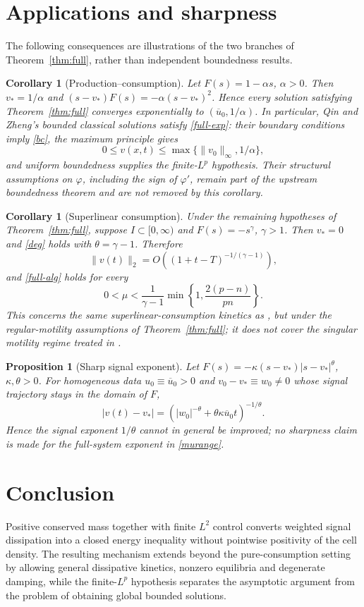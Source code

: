 \documentclass[final,5p,times,twocolumn]{elsarticle}
\newtheorem{corollary}[theorem]{Corollary}
\newtheorem{proposition}[theorem]{Proposition}
\newcommand{\norm}[1]{\lVert#1\rVert}
\newcommand{\ubar}{\overline u_0}
\begin{document}
\section{Applications and sharpness}
The following consequences are illustrations of the two branches of Theorem~\ref{thm:full}, rather than independent boundedness results.

\begin{corollary}[Production--consumption]\label{cor:qz}
Let $F(s)=1-\alpha s$, $\alpha>0$. Then $v_*=1/\alpha$ and $(s-v_*)F(s)=-\alpha(s-v_*)^2$. Hence every solution satisfying Theorem~\ref{thm:full} converges exponentially to $(\ubar,1/\alpha)$. In particular, Qin and Zheng's bounded classical solutions \cite{QinZheng2026} satisfy \eqref{full-exp}: their boundary conditions imply \eqref{bc}, the maximum principle gives
\[
0\le v(x,t)\le\max\{\norm{v_0}_\infty,1/\alpha\},
\]
and uniform boundedness supplies the finite-$L^p$ hypothesis. Their structural assumptions on $\varphi$, including the sign of $\varphi'$, remain part of the upstream boundedness theorem and are not removed by this corollary.
\end{corollary}

\begin{corollary}[Superlinear consumption]\label{cor:super}
Under the remaining hypotheses of Theorem~\ref{thm:full}, suppose $I\subset[0,\infty)$ and $F(s)=-s^\gamma$, $\gamma>1$. Then $v_*=0$ and \eqref{deg} holds with $\theta=\gamma-1$. Therefore
\[
\norm{v(t)}_2=O((1+t-T)^{-1/(\gamma-1)}),
\]
and \eqref{full-alg} holds for every
\[
0<\mu<\frac1{\gamma-1}\min\left\{1,\frac{2(p-n)}{pn}\right\}.
\]
This concerns the same superlinear-consumption kinetics as \cite{ZhangLi2025}, but under the regular-motility assumptions of Theorem~\ref{thm:full}; it does not cover the singular motility regime treated in \cite{ZhangLi2025}.
\end{corollary}

\begin{proposition}[Sharp signal exponent]\label{prop:sharp}
Let $F(s)=-\kappa(s-v_*)|s-v_*|^\theta$, $\kappa,\theta>0$. For homogeneous data $u_0\equiv\ubar>0$ and $v_0-v_*\equiv w_0\ne0$ whose signal trajectory stays in the domain of $F$,
\[
|v(t)-v_*|=\left(|w_0|^{-\theta}+\theta\kappa\ubar t\right)^{-1/\theta}.
\]
Hence the \emph{signal} exponent $1/\theta$ cannot in general be improved; no sharpness claim is made for the full-system exponent in \eqref{murange}.
\end{proposition}

\section{Conclusion}
Positive conserved mass together with finite $L^2$ control converts weighted signal dissipation into a closed energy inequality without pointwise positivity of the cell density. The resulting mechanism extends beyond the pure-consumption setting by allowing general dissipative kinetics, nonzero equilibria and degenerate damping, while the finite-$L^p$ hypothesis separates the asymptotic argument from the problem of obtaining global bounded solutions.
\end{document}
